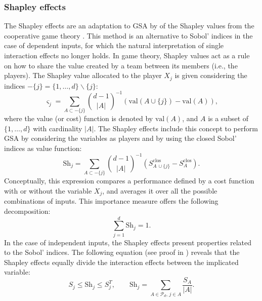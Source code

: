 \subsubsection{Shapley effects}
The Shapley effects are an adaptation to GSA by \citet{owen_2014_shapley} of the Shapley values from the cooperative game theory \citep{shapley_1953}. 
This method is an alternative to Sobol' indices in the case of dependent inputs, for which the natural interpretation of single interaction effects no longer holds. 
In game theory, Shapley values act as a rule on how to share the value created by a team between its members (i.e., the players). 
The Shapley value allocated to the player $X_j$ is given considering the indices $-\{j\}= \{1, \dots, d\} \backslash \{j\}$:
\begin{equation}
    \varsigma_j = \sum_{A \subset -\{j\}} \binom{d-1}{|A|}^{-1} \left(\mathrm{val}(A \cup \{j\}) - \mathrm{val}(A)\right),
\end{equation}
where the value (or cost) function is denoted by $\mathrm{val}(A)$, and $A$ is a subset of $\{1, \dots, d\}$ with cardinality $|A|$. 
The Shapley effects include this concept to perform GSA by considering the variables as players and by using the closed Sobol' indices as value function: 
\begin{equation}
    \label{eq:shapley_effects}
    \mbox{Sh}_j = \sum_{A \subset -\{j\}} \binom{d-1}{|A|}^{-1} \left(S_{A\, \cup \{j\}}^{\mathrm{clos}} - S_A^{\mathrm{clos}}\right).
\end{equation}
Conceptually, this expression compares a performance defined by a cost function with or without the variable $X_j$, and averages it over all the possible combinations of inputs. 
This importance measure offers the following decomposition: 
\begin{equation}
    \sum_{j=1}^{d} \mbox{Sh}_j = 1.
\end{equation}
In the case of independent inputs, the Shapley effects present properties related to the Sobol' indices. 
The following equation (see proof in \citealp{owen_2014_shapley}) reveals that the Shapley effects equally divide the interaction effects between the implicated variable:
\begin{equation}
    S_j \leq \mbox{Sh}_j \leq S_j^T, \qquad \mbox{Sh}_j = \sum_{A \in \mathcal{P}_d, \, j \in A} \frac{S_A}{|A|}.
\end{equation}   


